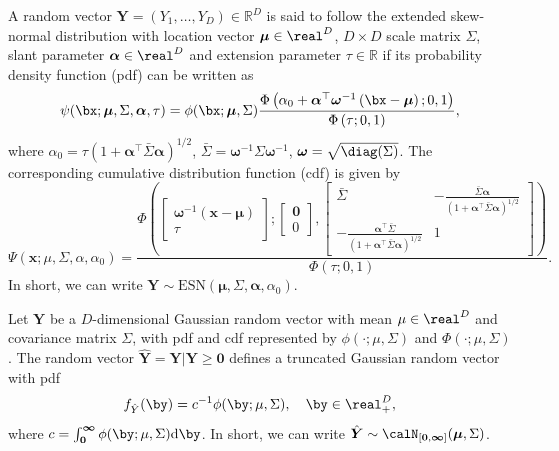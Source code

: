 \documentclass[12pt]{article}
\begin{document}
\begin{definition}

A random vector $\bm Y=(Y_1,\dots, Y_D) \in \mathbb{R}^D$ is said to follow the extended skew-normal distribution with location vector $\bm\mu \in \real^D$, $D \times D$ scale matrix $\Sigma$, slant parameter $\bm \alpha \in \real^D$ and extension parameter $\tau \in \mathbb{R}$ if its probability density function (pdf) can be written as
%
$$
\psi(\bx;\bm \mu,\Sigma,\bm \alpha,\tau) = 
\phi(\bx;\bm \mu,\Sigma) 
\frac{\Phi\left(\alpha_0 + \bm\alpha^\top \bm \omega^{-1}\left(\bx-\bm\mu\right); 0, 1\right)}{\Phi\left(\tau; 0, 1\right)},
$$
%
where $\alpha_0 = \tau \left(1+\bm\alpha^\top\bar\Sigma\bm\alpha \right)^{1/2}$, $\bar\Sigma = \bm \omega^{-1}\Sigma \bm \omega^{-1}$, $\bm \omega = \sqrt{\diag(\Sigma)}$.
%
The corresponding cumulative distribution function (cdf) is given by
%
\begin{equation*}
    \Psi(\bm x;\mu,\Sigma,\alpha,\alpha_0) =
    \frac{\Phi \left(
    \begin{bmatrix} 
        \bm \omega^{-1}( \bm x- \bm \mu)  \\
        \tau
    \end{bmatrix};
    \begin{bmatrix} 
    \bm 0 \\ 0
    \end{bmatrix},
    \begin{bmatrix}
        \bar\Sigma & -\frac{\bar{\Sigma}\bm\alpha}{(1+\bm\alpha^\top\bar{\Sigma}\bm\alpha)^{1/2}} \\
       -\frac{\bm\alpha^\top\bar{\Sigma}}{\left(1+\bm\alpha^\top\bar{\Sigma}\bm\alpha\right)^{1/2}} &	1
    \end{bmatrix} \right)
    }
    {\Phi\left(\tau; 0, 1\right)}.
\end{equation*}
%
In short, we can write $\bm Y \sim \text{ESN}(\bm\mu,\Sigma,\bm\alpha,\alpha_0)$.
\end{definition}

\begin{definition}
\label{def:mvnorm_trunc}

Let $\bm Y$ be a $D$-dimensional Gaussian random vector with mean $\mu \in \real^D$ and covariance matrix $\Sigma$, with pdf and cdf represented by $\phi(\cdot;\mu,\Sigma)$ and $\Phi(\cdot;\mu,\Sigma)$. The random vector $\hat{\bm Y} = \bm Y| \bm Y\geq \bm 0$ defines a truncated Gaussian random vector with pdf
%
$$
f_{\hat Y}(\by) = c^{-1} \phi(\by;\mu,\Sigma), \quad \by \in \real^D_+,
$$
%
where $c=\int_{\bm 0}^{\bm \infty} \phi(\by;\mu,\Sigma)\text d \by$. In short, we can write $\hat{\bm Y} \sim \calN_{\left[ \bm 0 , \bm \infty \right]}(\bm \mu, \Sigma)$. 
\end{definition}
\end{document}
